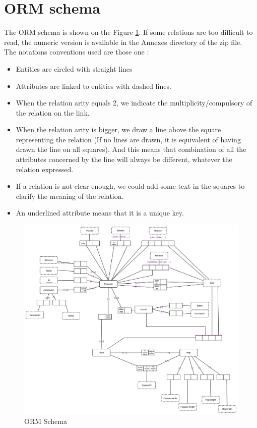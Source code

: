 \documentclass[a4paper ,12pt,french]{article}
\begin{document}
\section{ORM schema}


The ORM schema is shown on the Figure \ref{orm}. If some relations are too difficult to read, the numeric version is available in the Annexes directory of the zip file.\\ The notations conventions used are those one :
\begin{itemize}
\item Entities are circled with straight lines
\item Attributes are linked to entities with dashed lines.
\item When the relation arity equals 2, we indicate the multiplicity/compulsory of the relation on the link.
\item When the relation arity is bigger, we draw a line above the square representing the relation (If no lines are drawn, it is equivalent of having drawn the line on all squares). And this means that combination of all the attributes concerned by the line will always be different, whatever the relation expressed.
\item If a relation is not clear enough, we could add some text in the squares to clarify the meaning of the relation.
\item An underlined attribute means that it is a unique key.
\end{itemize}

\begin{figure}[!h]
\includegraphics[scale=0.43]{ORM.png}
\caption{ORM Schema}
\label{orm}
\end{figure}
\end{document}
